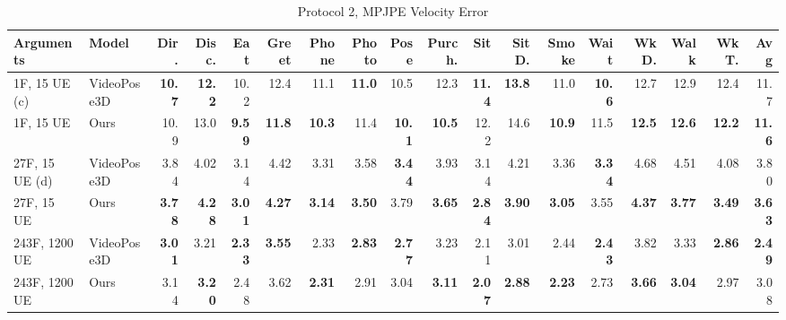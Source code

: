 \documentclass[10pt,twocolumn,letterpaper]{article}
\begin{document}
\begin{center}
\begin{table}
\small
\setlength\tabcolsep{2.3pt}
\begin{tabular}{l|l|rrrrrrrrrrrrrrrr} 
Arguments & Model & Dir. & Disc. & Eat & Greet & Phone & Photo & Pose & Purch. & Sit & SitD. & Smoke & Wait & WkD. & Walk & WkT. & \textbf{Avg} \\
\hline
1F, 15 UE (c) & VideoPose3D & \textbf{10.7} & \textbf{12.2} & 10.2 & 12.4 & 11.1 & \textbf{11.0} & 10.5 & 12.3 & \textbf{11.4} & \textbf{13.8} & 11.0 & \textbf{10.6} & 12.7 & 12.9 & 12.4 & 11.7  \\
1F, 15 UE & Ours & 10.9 & 13.0 & \textbf{9.59} & \textbf{11.8} & \textbf{10.3} & 11.4 & \textbf{10.1} & \textbf{10.5} & 12.2 & 14.6 & \textbf{10.9} & 11.5 & \textbf{12.5} & \textbf{12.6} & \textbf{12.2} & \textbf{11.6} \\
\hline
27F, 15 UE (d) & VideoPose3D & 3.84 & 4.02 & 3.14 & 4.42 & 3.31 & 3.58 & \textbf{3.44} & 3.93 & 3.14 & 4.21 & 3.36 & \textbf{3.34} & 4.68 & 4.51 & 4.08 & 3.80 \\
27F, 15 UE & Ours & \textbf{3.78} & \textbf{4.28} & \textbf{3.01} & \textbf{4.27} & \textbf{3.14} & \textbf{3.50} & 3.79 & \textbf{3.65} & \textbf{2.84} & \textbf{3.90} & \textbf{3.05} & 3.55 & \textbf{4.37} & \textbf{3.77} & \textbf{3.49} & \textbf{3.63}\\
\hline

243F, 1200 UE & VideoPose3D & \textbf{3.01} & 3.21 & \textbf{2.33} & \textbf{3.55} & 2.33 & \textbf{2.83} & \textbf{2.77} & 3.23 & 2.11 & 3.01 & 2.44 & \textbf{2.43} & 3.82 & 3.33 & \textbf{2.86} & \textbf{2.49} \\
243F, 1200 UE & Ours & 3.14 & \textbf{3.20} & 2.48 & 3.62 & \textbf{2.31} & 2.91 & 3.04 & \textbf{3.11} & \textbf{2.07} & \textbf{2.88} & \textbf{2.23} & 2.73 & \textbf{3.66} & \textbf{3.04} & 2.97 & 3.08 \\

 
\hline

\hline
\end{tabular}

\caption{Protocol 2, MPJPE Velocity Error}
\label{tab:V-MPJPE Error}
\end{table}
\end{center}


\end{document}
